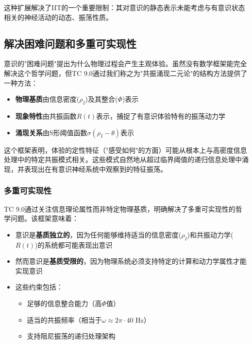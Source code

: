 \documentclass[12pt]{article}
\begin{document}
这种扩展解决了IIT的一个重要限制：其对意识的静态表示未能考虑与有意识状态相关的神经活动的动态、振荡性质。

\subsection{解决困难问题和多重可实现性}
意识的"困难问题"\cite{chalmers1995}提出为什么物理过程会产生主观体验。虽然没有数学框架能完全解决这个哲学问题，但TC 9.0通过我们称之为"共振涌现二元论"的结构方法提供了一种方法：

\begin{itemize}
    \item \textbf{物理基质}由信息密度($\rho_I$)及其整合($\Phi$)表示
    
    \item \textbf{现象特性}由共振函数$R(t)$表示，捕捉了有意识体验特有的振荡动力学
    
    \item \textbf{涌现关系}由S形阈值函数$\sigma(\rho_I - \theta)$表示
\end{itemize}

这个框架表明，体验的定性特征（"感受如何"的方面）可能从根本上与高密度信息处理中的特定共振模式相关。这些模式自然地从超过临界阈值的递归信息处理中涌现，并表现出在有意识神经系统中观察到的特征振荡。

\subsubsection{多重可实现性}
TC 9.0通过关注信息理论属性而非特定物理基质，明确解决了多重可实现性的哲学问题\cite{putnam1967}。该框架意味着：

\begin{itemize}
    \item 意识是\textbf{基质独立的}，因为任何能够维持适当的信息密度($\rho_I$)和共振动力学($R(t)$)的系统都可能表现出意识
    
    \item 然而意识是\textbf{基质受限的}，因为物理系统必须支持特定的计算和动力学属性才能实现意识
    
    \item 这些约束包括：
    \begin{itemize}[label=--]
        \item 足够的信息整合能力（高$\Phi$值）
        \item 适当的共振频率（相当于$\omega \approx 2\pi \cdot 40$ Hz）
        \item 支持阻尼振荡的递归处理架构
    \end{itemize}
\end{itemize}
\end{document}

